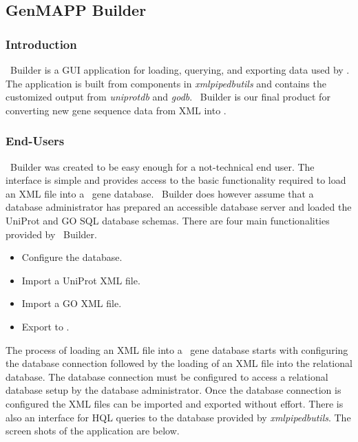 \subsection{GenMAPP Builder}
\label{gmbuilder}

\subsubsection{Introduction}
\genmapp~Builder is a GUI application for loading, querying, and exporting data
used by \genmapp. The application is built from components in \emph{xmlpipedbutils} and contains the customized output from \emph{uniprotdb} and \emph{godb}. \genmapp~Builder is our final product for converting new gene sequence data from XML into \genmapp.

\subsubsection{End-Users}
\genmapp~Builder was created to be easy enough for a not-technical end user.  The interface is simple and provides access to the basic functionality required to load an XML file into a \genmapp~gene database.  \genmapp~Builder does however assume that a database administrator has prepared an accessible database server and loaded the UniProt and GO SQL database schemas.  There are four main functionalities provided by \genmapp~Builder.
\begin{itemize}
	\item {Configure the database.}
	\item {Import a UniProt XML file. }
	\item {Import a GO XML file.}
	\item {Export to \genmapp.}
\end{itemize}
The process of loading an XML file into a \genmapp~gene database starts with configuring the database connection followed by the loading of an XML file into the relational database.  The database connection must be configured to access a relational database setup by the database administrator.  Once the database connection is configured the XML files can be imported and exported without effort.  There is also an interface for HQL queries to the database provided by \emph{xmlpipedbutils}.  The screen shots of the application are below.

